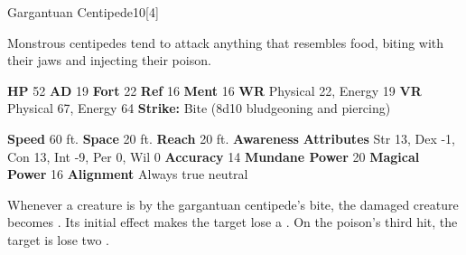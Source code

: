   
  \begin{monsection}{Gargantuan Centipede}{10}[4]
    \vspace{-1em}\vspace{-1em}
    \vspace{0em}

    
    Monstrous centipedes tend to attack anything that resembles food, biting with their jaws and injecting their poison.
  
    

    \begin{spellcontent}
      \begin{spelltargetinginfo}
        \pari \textbf{HP} 52 \monsep
          \textbf{AD} 19 \monsep
          \textbf{Fort} 22 \monsep
          \textbf{Ref} 16 \monsep
          \textbf{Ment} 16
        \pari \textbf{WR} Physical 22, Energy 19 \monsep
        \textbf{VR} Physical 67, Energy 64
        \pari \textbf{Strike:}
            Bite  (8d10 bludgeoning and piercing)
      \end{spelltargetinginfo}
    \end{spellcontent}
    \begin{monsterfooter}
      \pari \textbf{Speed} 60 ft. \monsep
        \textbf{Space} 20 ft. \monsep
        \textbf{Reach} 20 ft.
      \pari \textbf{Awareness} 
      \pari \textbf{Attributes}
        Str 13, Dex -1,
        Con 13, Int -9,
        Per 0, Wil 0
      \pari \textbf{Accuracy} 14 \monsep
        \textbf{Mundane Power} 20 \monsep
      \textbf{Magical Power} 16
      \pari \textbf{Alignment} Always true neutral
    \end{monsterfooter}
  \end{monsection}
    Whenever a creature is  by the gargantuan centipede's bite,
      the damaged creature becomes .
    Its initial effect makes the target lose a .
    On the poison's third hit, the target is lose two .
  
